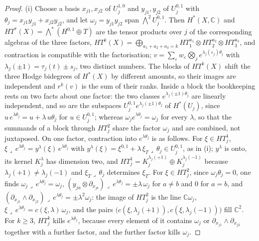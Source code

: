 \documentclass[11pt,reqno]{amsart}
\theoremstyle{plain}
\theoremstyle{definition}
\theoremstyle{remark}
\newcommand{\CC}{\mathbb{C}}
\begin{document}
\begin{proof}
(i) Choose a basis $x_{j1},x_{j2}$ of $U_{j}^{1,0}$ and $y_{j1},y_{j2}$ of
$U_{j}^{0,1}$ with $\theta_{j}=x_{j1}y_{j1}+x_{j2}y_{j2}$, and let
$\omega_{j}=y_{j1}y_{j2}$ span $\bigwedge^{2}U_{j}^{0,1}$. Then
$H^{*}(X,\CC)$ and $HT^{*}(X)=\bigwedge^{*}(H^{0,1}\oplus T)$ are the tensor
products over $j$ of the corresponding algebras of the three factors,
$HT^{k}(X)=\bigoplus_{a_{1}+a_{2}+a_{3}=k}HT^{a_{1}}_{1}\otimes HT^{a_{2}}_{2}
\otimes HT^{a_{3}}_{3}$, and contraction is compatible with the factorisation;
$v=\sum_{\varepsilon}w_{\varepsilon}\bigotimes_{j}e^{\lambda_{j}(\varepsilon_{j})\theta_{j}}$
with $\lambda_{j}(\pm1)=\tau_{j}(t)\pm s_{j}$, two distinct numbers. The blocks
of $HT^{k}(X)$ shift the three Hodge bidegrees of $H^{*}(X)$ by different
amounts, so their images are independent and $r^{k}(v)$ is the sum of their
ranks. Inside a block the bookkeeping rests on two facts about one factor:
the two classes $e^{\lambda_{j}(\pm1)\theta_{j}}$ are linearly independent,
and so are the subspaces $U_{j}^{0,1}e^{\lambda_{j}(\pm1)\theta_{j}}$ of
$H^{*}(U_{j})$, since $u\,e^{\lambda\theta_{j}}=u+\lambda\,u\theta_{j}$ for
$u\in U_{j}^{0,1}$; whereas $\omega_{j}e^{\lambda\theta_{j}}=\omega_{j}$ for
every $\lambda$, so that the summands of a block through $HT^{2}_{j}$ share the
factor $\omega_{j}$ and are combined, not juxtaposed. On one factor,
contraction into $e^{\lambda\theta_{j}}$ is as follows. For $\xi\in HT^{1}_{j}$,
$\xi\lrcorner\,e^{\lambda\theta_{j}}=y^{\lambda}(\xi)\,e^{\lambda\theta_{j}}$ with
$y^{\lambda}(\xi)=\xi^{0,1}+\lambda\,\xi_{T}\lrcorner\,\theta_{j}\in
U_{j}^{0,1}$, as in (i); $y^{\lambda}$ is onto, its kernel
$K^{\lambda}_{j}$ has dimension two, and
$HT^{1}_{j}=K^{\lambda_{j}(+1)}_{j}\oplus K^{\lambda_{j}(-1)}_{j}$ because
$\lambda_{j}(+1)\ne\lambda_{j}(-1)$ and $\xi_{T}\lrcorner\,\theta_{j}$
determines $\xi_{T}$. For $\xi\in HT^{2}_{j}$, since $\omega_{j}\theta_{j}=0$,
one finds $\omega_{j}\lrcorner\,e^{\lambda\theta_{j}}=\omega_{j}$,
$(y_{ja}\otimes\partial_{x_{jb}})\lrcorner\,e^{\lambda\theta_{j}}=\pm\lambda\,
\omega_{j}$ for $a\ne b$ and $0$ for $a=b$, and
$(\partial_{x_{j1}}\wedge\partial_{x_{j2}})\lrcorner\,e^{\lambda\theta_{j}}
=\pm\lambda^{2}\omega_{j}$: the image of $HT^{2}_{j}$ is the line
$\CC\omega_{j}$, $\xi\lrcorner\,e^{\lambda\theta_{j}}=c(\xi,\lambda)\,\omega_{j}$,
and the pairs $\bigl(c(\xi,\lambda_{j}(+1)),c(\xi,\lambda_{j}(-1))\bigr)$ fill
$\CC^{2}$. For $k\ge3$, $HT^{k}_{j}$ kills $e^{\lambda\theta_{j}}$, because
every element of it contains $\omega_{j}$ or $\partial_{x_{j1}}\wedge
\partial_{x_{j2}}$ together with a further factor, and the further factor
kills $\omega_{j}$.


\end{proof}
\end{document}
